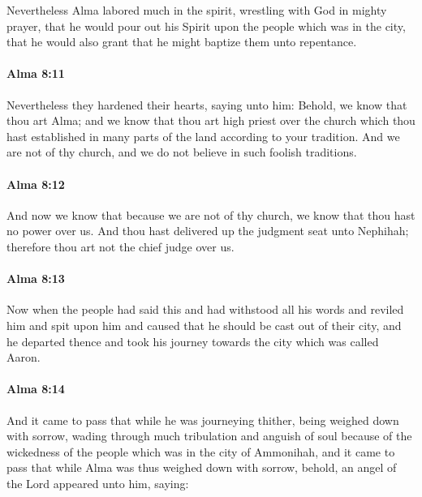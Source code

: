 			Nevertheless Alma labored much in the spirit,
			wrestling with God in mighty prayer,
			that he would pour out his Spirit upon the people which was in the city,
			that he would also grant that he might baptize them unto repentance.

		\paragraph{Alma 8:11} %
			\label{ALMA-8-11}

			Nevertheless they hardened their hearts, saying unto him:
			Behold, we know that thou art Alma;
			and we know that thou art high priest over the church
			which thou hast established in many parts of the land according to your tradition.
			And we are not of thy church,
			and we do not believe in such foolish traditions.

		\paragraph{Alma 8:12} %
			\label{ALMA-8-12}

			And now we know that because we are not of thy church,
			we know that thou hast no power over us.
			And thou hast delivered up the judgment seat unto Nephihah;
			therefore thou art not the chief judge over us.

		\paragraph{Alma 8:13} %
			\label{ALMA-8-13}

			Now when the people had said this
			and had withstood all his words and reviled him and spit upon him
			and caused that he should be cast out of their city,
			and he departed thence and took his journey
			towards the city which was called Aaron.

		\paragraph{Alma 8:14} %
			\label{ALMA-8-14}

			And it came to pass that while he was journeying thither,
			being weighed down with sorrow,
			wading through much tribulation and anguish of soul
			because of the wickedness of the people which was in the city of Ammonihah,
			and it came to pass that while Alma was thus weighed down with sorrow,
			behold, an angel of the Lord appeared unto him, saying:


